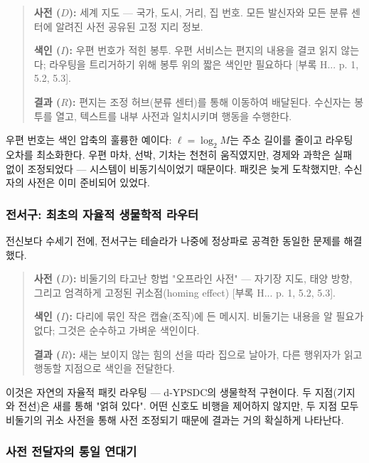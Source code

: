 \documentclass[12pt,a4paper]{article}
\begin{document}
	\begin{quote}
		\textbf{사전 ($D$):} 세계 지도 — 국가, 도시, 거리, 집 번호. 모든 발신자와 모든 분류 센터에 알려진 사전 공유된 고정 지리 정보.
		
		\textbf{색인 ($I$):} 우편 번호가 적힌 봉투. 우편 서비스는 편지의 내용을 결코 읽지 않는다; 라우팅을 트리거하기 위해 봉투 위의 짧은 색인만 필요하다 [부록 H... p. 1, 5.2, 5.3].
		
		\textbf{결과 ($R$):} 편지는 조정 허브(분류 센터)를 통해 이동하여 배달된다. 수신자는 봉투를 열고, 텍스트를 내부 사전과 일치시키며 행동을 수행한다.
	\end{quote}
	
	우편 번호는 색인 압축의 훌륭한 예이다: \( \ell = \log_2 M \)는 주소 길이를 줄이고 라우팅 오차를 최소화한다. 우편 마차, 선박, 기차는 천천히 움직였지만, 경제와 과학은 실패 없이 조정되었다 — 시스템이 비동기식이었기 때문이다. 패킷은 늦게 도착했지만, 수신자의 사전은 이미 준비되어 있었다.
	
	\subsubsection{전서구: 최초의 자율적 생물학적 라우터}
	
	전신보다 수세기 전에, 전서구는 테슬라가 나중에 정상파로 공격한 동일한 문제를 해결했다.
	
	\begin{quote}
		\textbf{사전 ($D$):} 비둘기의 타고난 항법 "오프라인 사전" — 자기장 지도, 태양 방향, 그리고 엄격하게 고정된 귀소점(homing effect) [부록 H... p. 1, 5.2, 5.3].
		
		\textbf{색인 ($I$):} 다리에 묶인 작은 캡슐(조직)에 든 메시지. 비둘기는 내용을 알 필요가 없다; 그것은 순수하고 가벼운 색인이다.
		
		\textbf{결과 ($R$):} 새는 보이지 않는 힘의 선을 따라 집으로 날아가, 다른 행위자가 읽고 행동할 지점으로 색인을 전달한다.
	\end{quote}
	
	이것은 자연의 자율적 패킷 라우팅 — d‑YPSDC의 생물학적 구현이다. 두 지점(기지와 전선)은 새를 통해 "얽혀 있다". 어떤 신호도 비행을 제어하지 않지만, 두 지점 모두 비둘기의 귀소 사전을 통해 사전 조정되기 때문에 결과는 거의 확실하게 나타난다.
	
	\subsubsection{사전 전달자의 통일 연대기}
	
\end{document}
